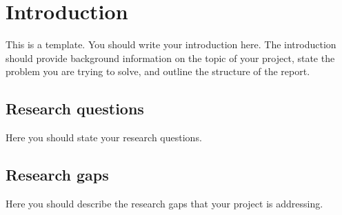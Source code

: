 \section{Introduction}
\label{sec:introduction}

This is a template. You should write your introduction here.
The introduction should provide background information on the topic of your project, state the problem you are trying to solve, and outline the structure of the report.

\subsection{Research questions}
\label{sec:question}

Here you should state your research questions.

\subsection{Research gaps}
\label{sec:gaps}

Here you should describe the research gaps that your project is addressing.

\newpage